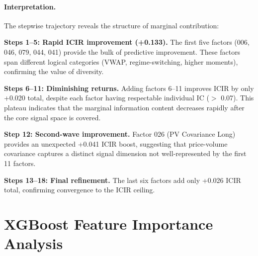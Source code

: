 \documentclass[sigconf]{acmart}
\begin{document}
\paragraph{Interpretation.}
The stepwise trajectory reveals the structure of marginal contribution:

\textbf{Steps 1--5: Rapid ICIR improvement (+0.133).}
The first five factors (006, 046, 079, 044, 041) provide the bulk of predictive improvement.
These factors span different logical categories (VWAP, regime-switching, higher moments), confirming the value of diversity.

\textbf{Steps 6--11: Diminishing returns.}
Adding factors 6--11 improves ICIR by only +0.020 total, despite each factor having respectable individual IC ($>$ 0.07).
This plateau indicates that the marginal information content decreases rapidly after the core signal space is covered.

\textbf{Step 12: Second-wave improvement.}
Factor 026 (PV Covariance Long) provides an unexpected +0.041 ICIR boost, suggesting that price-volume covariance captures a distinct signal dimension not well-represented by the first 11 factors.

\textbf{Steps 13--18: Final refinement.}
The last six factors add only +0.026 ICIR total, confirming convergence to the ICIR ceiling.

\section{XGBoost Feature Importance Analysis}
\label{app:xgb-importance}
\end{document}
